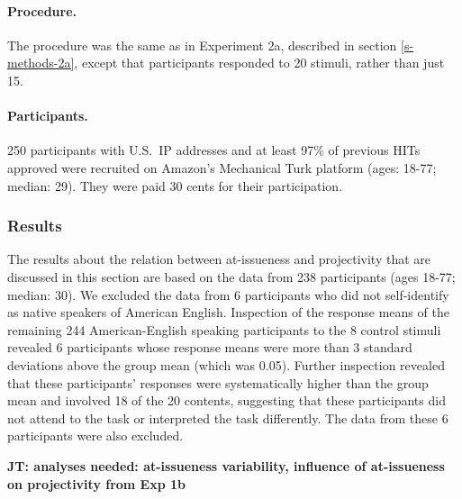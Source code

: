 \documentclass[11pt,fleqn]{article}
\newcommand{\6}{\mbox{$[\hspace*{-.6mm}[$}}
\newcommand{\9}{\mbox{$]\hspace*{-.6mm}]$}}
\newcommand{\jt}[1]{\textbf{\color{blue}JT: #1}}
\begin{document}
\paragraph{Procedure.} The procedure was the same as in Experiment 2a, described in section \ref{s-methods-2a}, except that participants responded to 20 stimuli, rather than just 15.

\paragraph{Participants.} 250 participants with U.S.\ IP addresses and at least 97\% of previous HITs approved were recruited on Amazon's Mechanical Turk platform (ages: 18-77; median: 29). They were paid 30 cents for their participation.

\subsubsection{Results}

The results about the relation between at-issueness and projectivity that are discussed in this section are based on the data from 238 participants (ages 18-77; median: 30). We excluded the data from 6 participants who did not self-identify as native speakers of American English. Inspection of the response means of the remaining 244 American-English speaking participants to the 8 control stimuli revealed 6 participants whose response means were more than 3 standard deviations above the group mean (which was 0.05). Further inspection revealed that these participants' responses were systematically higher than the group mean and involved 18 of the 20 contents, suggesting that these participants did not attend to the task or interpreted the task differently. The data from these 6 participants were also excluded.

\jt{analyses needed: at-issueness variability, influence of at-issueness on projectivity from Exp 1b}
\end{document}
